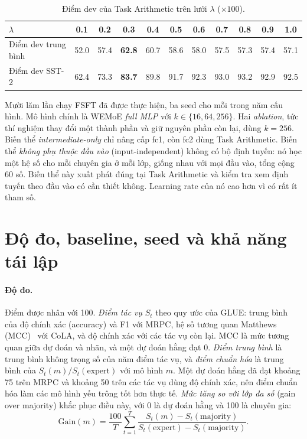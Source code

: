 \begin{table}[htbp]
  \centering\tablestyle
  \caption{Điểm dev của Task Arithmetic trên lưới $\lambda$ ($\times100$).}
  \label{tab:lambda}
  \begin{tabular}{l c c c c c c c c c c}
    \toprule
    $\lambda$ & 0.1 & 0.2 & \textbf{0.3} & 0.4 & 0.5 & 0.6 & 0.7 & 0.8 & 0.9 & 1.0\\
    \midrule
    Điểm dev trung bình & 52.0 & 57.4 & \textbf{62.8} & 60.7 & 58.6 & 58.0 & 57.5 & 57.3 & 57.4 & 57.1\\
    Điểm dev SST-2 & 62.4 & 73.3 & \textbf{83.7} & 89.8 & 91.7 & 92.3 & 93.0 & 93.2 & 92.9 & 92.5\\
    \bottomrule
  \end{tabular}
\end{table}

Mười lăm lần chạy FSFT đã được thực hiện, ba seed cho mỗi trong năm cấu hình. Mô hình chính là WEMoE \emph{full MLP} với $k\in\{16,64,256\}$. Hai \emph{ablation}, tức thí nghiệm thay đổi một thành phần và giữ nguyên phần còn lại, dùng $k=256$. Biến thể \emph{intermediate-only} chỉ nâng cấp fc1, còn fc2 dùng Task Arithmetic. Biến thể \emph{không phụ thuộc đầu vào} (input-independent) không có bộ định tuyến: nó học một hệ số cho mỗi chuyên gia ở mỗi lớp, giống nhau với mọi đầu vào, tổng cộng 60 số. Biến thể này xuất phát đúng tại Task Arithmetic và kiểm tra xem định tuyến theo đầu vào có cần thiết không. Learning rate của nó cao hơn vì có rất ít tham số.

\section{Độ đo, baseline, seed và khả năng tái lập}
\label{sec:metrics}

\paragraph{Độ đo.} Điểm được nhân với 100. \emph{Điểm tác vụ} $S_t$ theo quy ước của GLUE: trung bình của độ chính xác (accuracy) và F1 với MRPC, hệ số tương quan Matthews (MCC)~\cite{matthews1975mcc} với CoLA, và độ chính xác với các tác vụ còn lại. MCC là mức tương quan giữa dự đoán và nhãn, và một dự đoán hằng đạt 0. \emph{Điểm trung bình} là trung bình không trọng số của năm điểm tác vụ, và \emph{điểm chuẩn hóa} là trung bình của $S_t(m)/S_t(\mathrm{expert})$ với mô hình $m$. Một dự đoán hằng đã đạt khoảng 75 trên MRPC và khoảng 50 trên các tác vụ dùng độ chính xác, nên điểm chuẩn hóa làm các mô hình yếu trông tốt hơn thực tế. \emph{Mức tăng so với lớp đa số} (gain over majority) khắc phục điều này, với 0 là dự đoán hằng và 100 là chuyên gia:
\begin{equation}
\mathrm{Gain}(m)=\frac{100}{T}\sum_{t=1}^{T}\frac{S_t(m)-S_t(\mathrm{majority})}{S_t(\mathrm{expert})-S_t(\mathrm{majority})}.
\label{eq:gain}
\end{equation}


